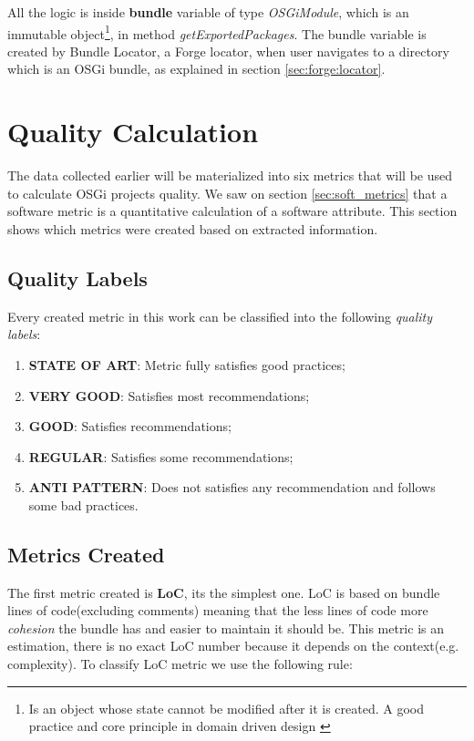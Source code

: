 All the logic is inside \textbf{bundle} variable of type \emph{OSGiModule}, which is an immutable object\footnote{Is an object whose state cannot be modified after it is created. A good practice and core principle in domain driven design \citep{Evans 2003}}, in method \emph{getExportedPackages}. The bundle variable is created by Bundle Locator, a Forge locator, when user navigates to a directory which is an OSGi bundle, as explained in section \ref{sec:forge:locator}. 

\section{Quality Calculation}
The data collected earlier will be materialized into six metrics that will be used to calculate OSGi projects quality. We saw on section \ref{sec:soft_metrics} that a software metric is a quantitative calculation of a software attribute. This section shows which metrics were created based on extracted information.


\subsection{Quality Labels}
Every created metric in this work can be classified into the following \emph{quality labels}:

\begin{enumerate}
\item \textbf{STATE OF ART}: Metric fully satisfies good practices;
\item \textbf{VERY GOOD}: Satisfies most recommendations;
\item \textbf{GOOD}: Satisfies recommendations;
\item \textbf{REGULAR}: Satisfies some recommendations;
\item \textbf{ANTI PATTERN}: Does not satisfies any recommendation and follows some bad practices.
\end{enumerate}


\subsection{Metrics Created}

The first metric created is \textbf{LoC}, its the simplest one. LoC is based on bundle lines of code(excluding comments) meaning that the less lines of code more \emph{cohesion} the bundle has and easier to maintain it should be. This metric is an estimation, there is no exact LoC number because it depends on the context(e.g. complexity). To classify LoC metric we use the following rule:\newline


